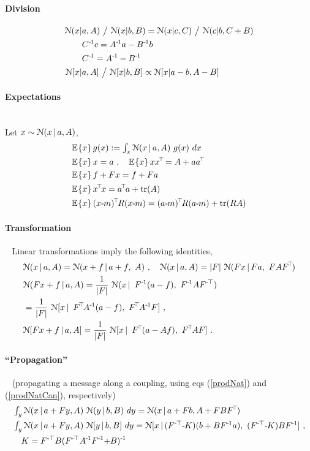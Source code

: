 \paragraph{Division}
\begin{align}
\NN(x|&a,A) ~\big/~ \NN(x|b,B) = \NN(x|c,C) ~\big/~ \NN(c| b, C+B) \feed
 & C^\1c = A^\1a - B^\1b \feed
 & C^\1 = A^\1 - B^\1 \\
\NN[x|&a,A] ~\big/~ \NN[x|b,B] \propto \NN[x|a-b,A-B]
\end{align}

\paragraph{Expectations}~\\
Let $x\sim\NN(x\|a,A)$,
\begin{align}
&\Exp{x}{g(x)} := \textstyle\int_x \NN(x \| a,A)~ g(x)~ dx \\
&\Exp{x}{x} = a \comma \Exp{x}{x x^\T} = A + a a^\T\\
&\Exp{x}{f+Fx} = f+Fa \\
&\Exp{x}{x^\T x} = a^\T a + \tr(A)\\
&\Exp{x}{(x\-m)^\T R(x\-m)} = (a\-m)^\T R(a\-m) + \tr(RA)
\end{align}

\paragraph{Transformation}~
Linear transformations imply the following identities,
\begin{align}
& \NN(x\|a,A) = \NN(x+f\|a+f,~A) \comma
  \NN(x\|a,A) = |F|~ \NN(Fx \| Fa,~FAF^\T) \\
& \NN(F x + f \| a,A)
 = \frac{1}{|F|}~ \NN(x \| ~ F^\1 (a-f),~ F^\1 AF^\mT) \\
&= \frac{1}{|F|}~ \NN[x \| ~ F^\T A^\1 (a-f),~ F^\T A^\1 F] ~, \\
& \NN[F x + f \| a,A] = \frac{1}{|F|}~ \NN[x \| ~ F^\T(a-Af),~ F^\T A F] ~.
\end{align}

\paragraph{``Propagation''}~ (propagating a message along a coupling, using
 eqs (\ref{prodNat}) and (\ref{prodNatCan}), respectively)\\
\begin{align}
& \textstyle\int_y \NN(x \| a + Fy, A)~ \NN(y \| b, B)~ dy
 = \NN(x \| a + Fb, A+FBF^\T) \\
& \textstyle\int_y \NN(x \| a + Fy, A)~ \NN[y \| b, B]~ dy
 = \NN[x \| (F^\mT\-K)(b+BF^\1a),~ (F^\mT\-K)BF^\1] ~,\\
 &\quad K=F^\mT B(F^\mT A^\1 F^\1\+B)^\1
\end{align}

